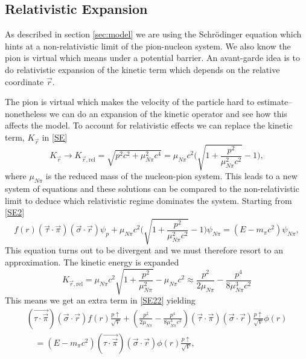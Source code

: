 \subsection{Relativistic Expansion}
As described in section \ref{sec:model} we are using the Schrödinger equation which hints at a non-relativistic limit of the pion-nucleon system. We also know the pion is virtual which means under a potential barrier. An avant-garde idea is to do relativistic expansion of the kinetic term which depends on the relative coordinate $\vec{r}$. 


%
The pion is virtual which makes the velocity of the particle hard to estimate--nonetheless we can do an expansion of the kinetic operator and see how this affects the model. To account for relativistic effects we can replace the kinetic term, $K_{\vec{r}}$ in \eqref{SE}
\begin{equation}
	K_{\vec{r}}\rightarrow K_{\vec{r},\text{rel}} = \sqrt{p^2 c^2+\mu_{N\pi}^2 c^4} = \mu_{N\pi} c^2 \bigg(\sqrt{1+\frac{p^2}{\mu_{N\pi}^2 c^2}}-1 \bigg),
\end{equation}
where $\mu_{N\pi}$ is the reduced mass of the nucleon-pion system. This leads to a new system of equations and these solutions can be compared to the non-relativistic limit to deduce which relativistic regime dominates the system. Starting from \eqref{SE2}
\begin{equation}
	f(r) (\vec{\tau} \cdot \vec{\pi})(\vec{\sigma}\cdot \vec{r})\psi_p + \mu_{N\pi} c^2 \bigg(\sqrt{1+\frac{p^2}{\mu_{N\pi}^2 c^2}}-1 \bigg)\psi_{N\pi} = (E-m_{\pi}c^2)\psi_{N\pi},
\end{equation}
This equation turns out to be divergent and we must therefore resort to an approximation. The kinetic energy is expanded
\begin{equation}
	K_{\vec{r},\text{rel}} = \mu_{N\pi} c^2\sqrt{1+\frac{p^2}{\mu_{N\pi}^2}}-\mu_{N\pi} c^2 \approx \frac{p^2}{2\mu_{N\pi}}-\frac{p^4}{8\mu_{N\pi}^3 c^2}
\end{equation}
This means we get an extra term in \eqref{SE22} yielding
\begin{equation}\begin{split}\label{SErel}
		(\vec{\tau\cdot\vec{\pi}})(\vec{\sigma}\cdot\vec{r})f(r)  \frac{p\uparrow}{\sqrt{V}}+\left(\frac{p^2}{2\mu_{N\pi}}-\frac{p^4}{8\mu_{N\pi}^3 c^2} \right)(\vec{\tau}\cdot\vec{\pi})(\vec{\sigma}\cdot\vec{r})\frac{p\uparrow}{\sqrt{V}}\phi(r) \\ \quad= (E-m_\pi c^2) (\vec{\tau\cdot\vec{\pi}})(\vec{\sigma}\cdot\vec{r}) \phi(r)\frac{p\uparrow}{\sqrt{V}},
	\end{split}
\end{equation}
